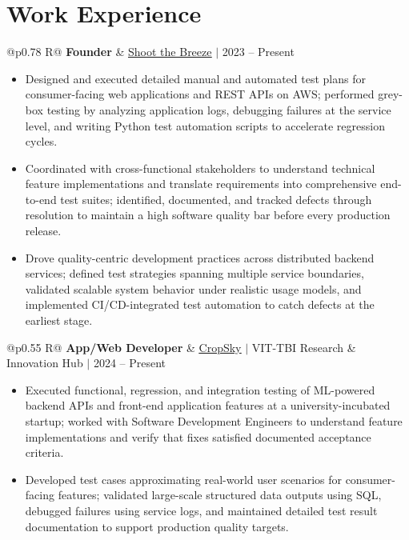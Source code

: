 \documentclass[a4paper,10pt]{article}
\newcommand{\ulink}[2]{\href{#1}{\uline{#2}}}
\newcommand{\subheading}[1]{{\color[HTML]{0A0A0A}\fontsize{12}{14}\selectfont\bfseries #1}}
\newcommand{\meta}[1]{{\color[HTML]{5C5C5C}\fontsize{10.5}{12.5}\selectfont #1}}
\begin{document}
\vspace{2pt}

\section{Work Experience}
\vspace{2pt}

\begin{tabularx}{\linewidth}{@{}p{0.78\linewidth} R@{}}
\subheading{Founder} & \meta{\ulink{https://shoot-the-breeze.vercel.app}{Shoot the Breeze} $|$ 2023 -- Present}
\end{tabularx}
\begin{itemize}[nosep, leftmargin=1.5em, itemsep=1pt, topsep=2pt]
\item {\color[HTML]{0A0A0A}\fontsize{11}{14}\selectfont
Designed and executed detailed manual and automated test plans for consumer-facing web applications and REST APIs on AWS; performed grey-box testing by analyzing application logs, debugging failures at the service level, and writing Python test automation scripts to accelerate regression cycles.}
\item {\color[HTML]{0A0A0A}\fontsize{11}{14}\selectfont
Coordinated with cross-functional stakeholders to understand technical feature implementations and translate requirements into comprehensive end-to-end test suites; identified, documented, and tracked defects through resolution to maintain a high software quality bar before every production release.}
\item {\color[HTML]{0A0A0A}\fontsize{11}{14}\selectfont
Drove quality-centric development practices across distributed backend services; defined test strategies spanning multiple service boundaries, validated scalable system behavior under realistic usage models, and implemented CI/CD-integrated test automation to catch defects at the earliest stage.}
\end{itemize}

\vspace{2pt}

\begin{tabularx}{\linewidth}{@{}p{0.55\linewidth} R@{}}
\subheading{App/Web Developer} & \meta{\ulink{https://sites.google.com/view/cropsky/home}{CropSky} $|$ VIT-TBI Research \& Innovation Hub $|$ 2024 -- Present}
\end{tabularx}
\begin{itemize}[nosep, leftmargin=1.5em, itemsep=1pt, topsep=2pt]
\item {\color[HTML]{0A0A0A}\fontsize{11}{14}\selectfont
Executed functional, regression, and integration testing of ML-powered backend APIs and front-end application features at a university-incubated startup; worked with Software Development Engineers to understand feature implementations and verify that fixes satisfied documented acceptance criteria.}
\item {\color[HTML]{0A0A0A}\fontsize{11}{14}\selectfont
Developed test cases approximating real-world user scenarios for consumer-facing features; validated large-scale structured data outputs using SQL, debugged failures using service logs, and maintained detailed test result documentation to support production quality targets.}
\end{itemize}
\end{document}
